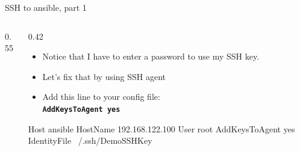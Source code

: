 \documentclass[aspectratio=169,12pt]{beamer}
\begin{document}
\begin{frame}[fragile]{SSH to ansible, part 1}
\begin{columns}[T]
\begin{column}{0.55\textwidth}
\end{column}
\begin{column}{0.42\textwidth}
\begin{itemize}
  \item Notice that I have to enter a password to use my SSH key.
  \item Let's fix that by using SSH agent
  \item Add this line to your config file:\\
    \textbf{\texttt{AddKeysToAgent yes}}
\end{itemize}
\vspace{0.2cm}
\begin{codesshsmall}
Host ansible
    HostName 192.168.122.100
    User root
    AddKeysToAgent yes
    IdentityFile ~/.ssh/DemoSSHKey
\end{codesshsmall}
\end{column}
\end{columns}
\end{frame}
\end{document}
